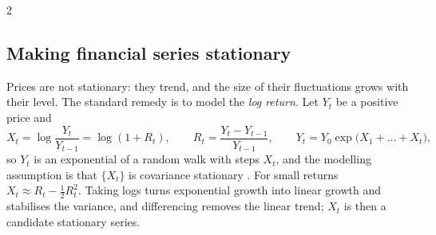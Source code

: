 \begin{paracol}{2}
\subsection{Making financial series stationary}\label{ch09:sec-logret}
Prices are not stationary: they trend, and the size of their fluctuations grows with their level. The
standard remedy is to model the \emph{log return}. Let $Y_t$ be a positive price and
\begin{equation}\label{ch09:eq-logret}
  X_t=\log\frac{Y_t}{Y_{t-1}}=\log(1+R_t),\qquad R_t=\frac{Y_t-Y_{t-1}}{Y_{t-1}},\qquad
  Y_t=Y_0\exp\bigl(X_1+\dots+X_t\bigr),
\end{equation}
so $Y_t$ is an exponential of a random walk with steps $X_t$, and the modelling assumption is that
$\{X_t\}$ is covariance stationary . For small returns
$X_t\approx R_t-\tfrac12R_t^2$. Taking logs turns exponential growth into linear growth and stabilises
the variance, and differencing removes the linear trend; $X_t$ is then a candidate stationary series.


\end{paracol}
